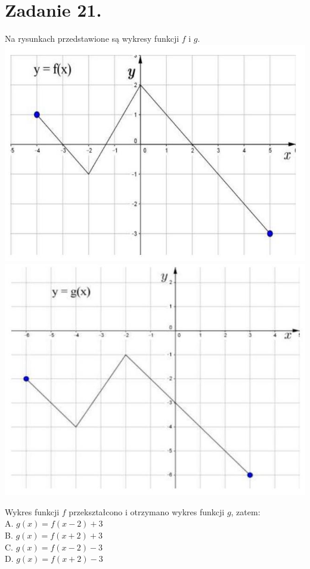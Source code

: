 \documentclass[10pt]{article}
\begin{document}
\section*{Zadanie 21.}
Na rysunkach przedstawione są wykresy funkcji \(f\) i \(g\).\\
\includegraphics[max width=\textwidth, center]{2024_11_21_94f02db55673a8a7b820g-10}\\
\includegraphics[max width=\textwidth, center]{2024_11_21_94f02db55673a8a7b820g-10(1)}

Wykres funkcji \(f\) przekształcono i otrzymano wykres funkcji \(g\), zatem:\\
A. \(g(x)=f(x-2)+3\)\\
B. \(g(x)=f(x+2)+3\)\\
C. \(g(x)=f(x-2)-3\)\\
D. \(g(x)=f(x+2)-3\)
\end{document}
